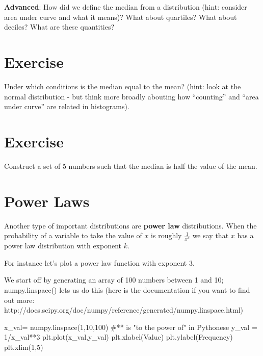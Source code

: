 \documentclass[
  letterpaper,
  DIV=11,
  numbers=noendperiod]{scrreprt}
\newenvironment{Shaded}{\begin{snugshade}}{\end{snugshade}}
\newcommand{\CommentTok}[1]{\textcolor[rgb]{0.37,0.37,0.37}{#1}}
\newcommand{\DecValTok}[1]{\textcolor[rgb]{0.68,0.00,0.00}{#1}}
\newcommand{\NormalTok}[1]{\textcolor[rgb]{0.00,0.23,0.31}{#1}}
\newcommand{\OperatorTok}[1]{\textcolor[rgb]{0.37,0.37,0.37}{#1}}
\newcommand{\StringTok}[1]{\textcolor[rgb]{0.13,0.47,0.30}{#1}}
\begin{document}
\textbf{Advanced}: How did we define the median from a distribution
(hint: consider area under curve and what it means)? What about
quartiles? What about deciles? What are these quantities?

\hypertarget{exercise-17}{%
\section{Exercise}\label{exercise-17}}

Under which conditions is the median equal to the mean? (hint: look at
the normal distribution - but think more broadly abouting how
``counting'' and ``area under curve'' are related in histograms).

\hypertarget{exercise-18}{%
\section{Exercise}\label{exercise-18}}

Construct a set of 5 numbers such that the median is half the value of
the mean.

\hypertarget{power-laws}{%
\section{Power Laws}\label{power-laws}}

Another type of important distributions are \textbf{power law}
distributions. When the probability of a variable to take the value of
\(x\) is roughly \(\frac{1}{x^k}\) we say that \(x\) has a power law
distribution with exponent \(k\).

For instance let's plot a power law function with exponent 3.

We start off by generating an array of 100 numbers between 1 and 10;
numpy.linspace() lets us do this (here is the documentation if you want
to find out more:
http://docs.scipy.org/doc/numpy/reference/generated/numpy.linspace.html)

\begin{Shaded}
\begin{Highlighting}[]
\NormalTok{x\_val}\OperatorTok{=}\NormalTok{ numpy.linspace(}\DecValTok{1}\NormalTok{,}\DecValTok{10}\NormalTok{,}\DecValTok{100}\NormalTok{)}
\CommentTok{\#** is "to the power of" in Pythonese}
\NormalTok{y\_val }\OperatorTok{=} \DecValTok{1}\OperatorTok{/}\NormalTok{x\_val}\OperatorTok{**}\DecValTok{3}
\NormalTok{plt.plot(x\_val,y\_val)}
\NormalTok{plt.xlabel(}\StringTok{\textquotesingle{}Value\textquotesingle{}}\NormalTok{)}
\NormalTok{plt.ylabel(}\StringTok{\textquotesingle{}Frequency\textquotesingle{}}\NormalTok{)}
\NormalTok{plt.xlim(}\DecValTok{1}\NormalTok{,}\DecValTok{5}\NormalTok{)}
\end{Highlighting}
\end{Shaded}
\end{document}
